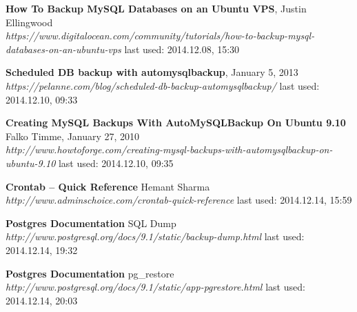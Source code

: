 \documentclass[10pt]{article}
\begin{document}
\begin{thebibliography}{56}
  \textbf{How To Backup MySQL Databases on an Ubuntu VPS},  Justin Ellingwood \\
  \textit{https://www.digitalocean.com/community/tutorials/how-to-backup-mysql-databases-on-an-ubuntu-vps}
  \newline last used: 2014.12.08, 15:30
  
  \textbf{Scheduled DB backup with automysqlbackup}, January 5, 2013 \\
  \textit{https://pelanne.com/blog/scheduled-db-backup-automysqlbackup/}
  \newline last used: 2014.12.10, 09:33
  
  \textbf{Creating MySQL Backups With AutoMySQLBackup On Ubuntu 9.10}\\ Falko Timme, January 27, 2010 \\
  \textit{http://www.howtoforge.com/creating-mysql-backups-with-automysqlbackup-on-ubuntu-9.10}
  \newline last used: 2014.12.10, 09:35
  
  
  \textbf{Crontab – Quick Reference}  Hemant Sharma \\
  \textit{http://www.adminschoice.com/crontab-quick-reference}
  \newline last used: 2014.12.14, 15:59
  
  \textbf{Postgres Documentation} SQL Dump\\
  \textit{http://www.postgresql.org/docs/9.1/static/backup-dump.html}
  \newline last used: 2014.12.14, 19:32
    
  \textbf{Postgres Documentation} pg\_restore\\
  \textit{  http://www.postgresql.org/docs/9.1/static/app-pgrestore.html}
  \newline last used: 2014.12.14, 20:03

\end{thebibliography}
\end{document}
